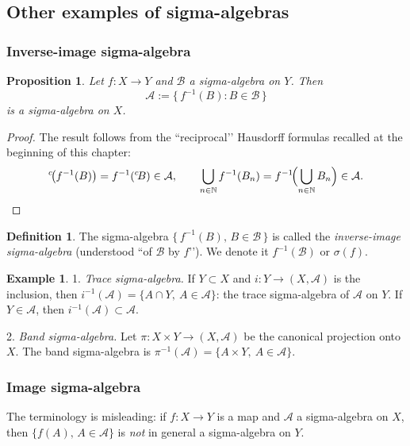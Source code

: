 \documentclass[12pt]{article}
\newtheorem{proposition}{Proposition}[section]
\theoremstyle{definition}
\newtheorem{definition}{Definition}[section]
\newtheorem{example}{Example}[section]
\begin{document}
\subsection{Other examples of sigma-algebras}\label{subsec:3.2}

\subsubsection{Inverse-image sigma-algebra}

\begin{proposition}\label{prop:preimage}
Let $f:X\to Y$ and $\mathcal B$ a sigma-algebra on $Y$. Then
\[
\mathcal A:=\{\,f^{-1}(B): B\in\mathcal B\,\}
\]
is a sigma-algebra on $X$.
\end{proposition}

\begin{proof}
The result follows from the “reciprocal’’ Hausdorff formulas recalled at the beginning of this chapter:
\[
{}^{c}\!\bigl(f^{-1}(B)\bigr)= f^{-1}({}^{c}\!B)\in\mathcal A,
\qquad
\bigcup_{n\in\mathbb N} f^{-1}(B_n)= f^{-1}\!\Bigl(\bigcup_{n\in\mathbb N} B_n\Bigr)\in\mathcal A.
\]

\end{proof}

\begin{definition}
The sigma-algebra $\{\,f^{-1}(B),\, B\in\mathcal B\,\}$ is called the \emph{inverse-image sigma-algebra} (understood “of $\mathcal B$ by $f$’’). We denote it $f^{-1}(\mathcal B)$ or $\sigma(f)$.
\end{definition}

\begin{example}
1. \emph{Trace sigma-algebra.} If $Y\subset X$ and $i:Y\to(X,\mathcal A)$ is the inclusion, then $i^{-1}(\mathcal A)=\{A\cap Y,\ A\in\mathcal A\}$: the trace sigma-algebra of $\mathcal A$ on $Y$. If $Y\in\mathcal A$, then $i^{-1}(\mathcal A)\subset\mathcal A$.

2. \emph{Band sigma-algebra.} Let $\pi:X\times Y\to (X,\mathcal A)$ be the canonical projection onto $X$. The band sigma-algebra is $\pi^{-1}(\mathcal A)=\{A\times Y,\ A\in\mathcal A\}$.
\end{example}

\subsubsection{Image sigma-algebra}

The terminology is misleading: if $f:X\to Y$ is a map and $\mathcal A$ a sigma-algebra on $X$, then $\{f(A),\, A\in\mathcal A\}$ is \emph{not} in general a sigma-algebra on $Y$.
\end{document}
